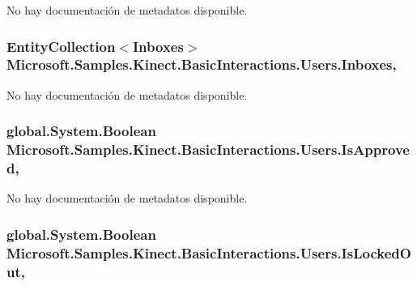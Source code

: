 No hay documentación de metadatos disponible. 

\hypertarget{class_microsoft_1_1_samples_1_1_kinect_1_1_basic_interactions_1_1_users_aab16b6d5d617b896adb7f97fd6cf4071}{
\subsubsection[{Inboxes}]{\setlength{\rightskip}{0pt plus 5cm}Entity\-Collection$<${\bf Inboxes}$>$ Microsoft.\-Samples.\-Kinect.\-Basic\-Interactions.\-Users.\-Inboxes\hspace{0.3cm}{\ttfamily [get]}, {\ttfamily [set]}}}\label{class_microsoft_1_1_samples_1_1_kinect_1_1_basic_interactions_1_1_users_aab16b6d5d617b896adb7f97fd6cf4071}


No hay documentación de metadatos disponible. 

\hypertarget{class_microsoft_1_1_samples_1_1_kinect_1_1_basic_interactions_1_1_users_a25c87f9eb56f7d1058cc28954c448140}{
\subsubsection[{Is\-Approved}]{\setlength{\rightskip}{0pt plus 5cm}global.\-System.\-Boolean Microsoft.\-Samples.\-Kinect.\-Basic\-Interactions.\-Users.\-Is\-Approved\hspace{0.3cm}{\ttfamily [get]}, {\ttfamily [set]}}}\label{class_microsoft_1_1_samples_1_1_kinect_1_1_basic_interactions_1_1_users_a25c87f9eb56f7d1058cc28954c448140}


No hay documentación de metadatos disponible. 

\hypertarget{class_microsoft_1_1_samples_1_1_kinect_1_1_basic_interactions_1_1_users_a6ff5155691e87585c660347a1311eaac}{
\subsubsection[{Is\-Locked\-Out}]{\setlength{\rightskip}{0pt plus 5cm}global.\-System.\-Boolean Microsoft.\-Samples.\-Kinect.\-Basic\-Interactions.\-Users.\-Is\-Locked\-Out\hspace{0.3cm}{\ttfamily [get]}, {\ttfamily [set]}}}\label{class_microsoft_1_1_samples_1_1_kinect_1_1_basic_interactions_1_1_users_a6ff5155691e87585c660347a1311eaac}


